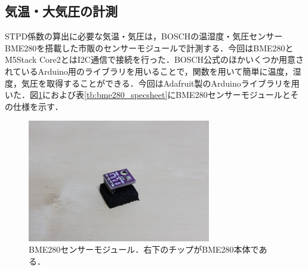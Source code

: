 
\subsection{気温・大気圧の計測}

STPD係数の算出に必要な気温・気圧は，BOSCHの温湿度・気圧センサーBME280を搭載した市販のセンサーモジュールで計測する．今回はBME280とM5Stack Core2とはI2C通信で接続を行った．BOSCH公式のほかいくつか用意されているArduino用のライブラリを用いることで，関数を用いて簡単に温度，湿度，気圧を取得することができる．今回はAdafruit製のArduinoライブラリを用いた．図\ref{fig:bme280}におよび表\ref{tb:bme280_specsheet}にBME280センサーモジュールとその仕様を示す．

\begin{figure}[H]
  \begin{center}
    \includegraphics[width=8cm]{fig/bme280}
    \caption{BME280センサーモジュール．右下のチップがBME280本体である．}
    \label{fig:bme280}
  \end{center}
\end{figure}

